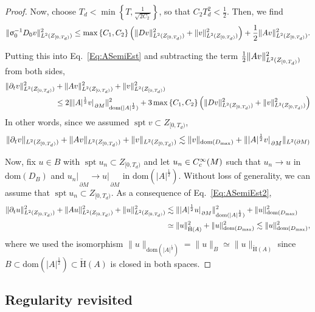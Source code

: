 \documentclass[a4paper,10pt,reqno]{amsart}
\newcommand{\sym}{\upsigma}
\newcommand{\rest}[1]{{{\lvert_{}}_{}}_{#1}}
\newcommand{\cbrac}[1]{\left(#1\right)}
\newcommand{\dbrac}[1]{\left\{#1\right\}}
\newcommand{\modulus}[1]{|#1|}
\newcommand{\norm}[1]{\| #1 \|}%
\newcommand{\set}[1]{\dbrac{#1}}
\newcommand{\Lp}[2][{}]{{\rm L}^{#2}_{\rm #1}}%
\newcommand{\Ck}[2][{}]{{\rm C}^{#2}_{\rm #1}}%
\newcommand{\checkH}{\check{\mathrm{H}}}
\newcommand{\dom}{\mathrm{dom}}
\DeclareMathOperator{\spt}{spt}%
\newcommand{\dM}{\partial M}
\theoremstyle{definition}
\begin{document}
\begin{proof}
Now, choose $T_d < \min\set{ T, \tfrac{1}{\sqrt{2C_2}}}$, so that $C_2 T_d^2 < \tfrac12$.
Then, we find 
\begin{equation*}
\norm{\sym_0^{-1} D_0 v}^2_{\Lp{2}(Z_{[0,T_d)})} 
\leq
 \max\set{C_1, C_2} \cbrac{\norm{Dv}^2_{\Lp{2}(Z_{[0,T_d)})} + \norm{v}_{\Lp{2}(Z_{[0,T_d)})}^2} + \frac12  \norm{Av}^2_{\Lp{2}(Z_{[0,T_d)})}.
\end{equation*}

Putting this into Eq.~\eqref{Eq:ASemiEst} and subtracting the term $\frac12  \norm{Av}^2_{\Lp{2}(Z_{[0,T_d)})}$ from both sides, 
\begin{align*}
\norm{\partial_t v}^2_{\Lp{2}(Z_{[0,T_d)})} &+ \norm{Av}^2 _{\Lp{2}(Z_{[0,T_d)})} + \norm{v}_{\Lp{2}(Z_{[0,T_d)})}^2   \\ 
&\leq 
2 \norm{\modulus{A}^{\frac12} v\rest{\dM}}_{\dom(\modulus{A}^{\frac12})}^2 + 3 \max\set{C_1, C_2} \cbrac{ \norm{Dv}^2_{\Lp{2}(Z_{[0,T_d)})} + \norm{v}^2_{\Lp{2}(Z_{[0,T_d)})}}
\end{align*}
In other words, since we assumed $\spt v \subset Z_{[0,T_d)}$,
\begin{equation}
\label{Eq:ASemiEst2} 
\norm{\partial_t v}_{\Lp{2}(Z_{[0,T_d)})} + \norm{Av}_{\Lp{2}(Z_{[0,T_d)})} + \norm{v}_{\Lp{2}(Z_{[0,T_d)})}
\lesssim \norm{v}_{\dom(D_{\max})} + \norm{ \modulus{A}^{\frac12} v\rest{\dM}}_{\Lp{2}(\dM)} 
\end{equation}  

Now, fix $u \in B$  with $\spt u_n \subset Z_{[0,T_d)}$ and let $u_n \in \Ck[c]{\infty}(M)$ such that $u_n \to u$ in $\dom(D_B)$ and $u_n\rest{\dM} \to u\rest{\dM}$ in $\dom(\modulus{A}^{\frac12})$.
Without loss of generality, we can assume that $\spt u_n \subset Z_{[0,T_d)}$.
As a consequence of Eq.~\eqref{Eq:ASemiEst2},
\begin{align*} 
\norm{\partial_t u}^2_{\Lp{2}(Z_{[0,T_d)})} + \norm{Au}^2 _{\Lp{2}(Z_{[0,T_d)})} + \norm{u}_{\Lp{2}(Z_{[0,T_d)})}^2   
&\lesssim 
\norm{\modulus{A}^{\frac12} u\rest{\dM}}_{\dom(\modulus{A}^{\frac12})}^2 + \norm{u}^2_{\dom(D_{\max})} \\ 
&\simeq 
\norm{u}_{\checkH(A)}^2 + \norm{u}^2_{\dom(D_{\max})} 
\lesssim 
\norm{u}_{\dom(D_{\max})}^2,
\end{align*}
where we used the isomorphism $\norm{u}_{\dom(\modulus{A}^{\frac12})} = \norm{u}_{B} \simeq \norm{u}_{\checkH(A)}$ since $B \subset \dom(\modulus{A}^{\frac12}) \subset \checkH(A)$ is closed in both spaces.
\end{proof}

\subsection{Regularity revisited}
\end{document}

